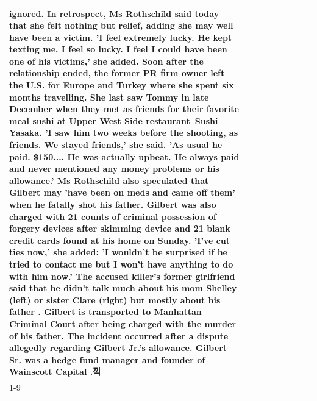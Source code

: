 \begin{table}[H]
\begin{tabular}{lllrlllll}
ignored. In retrospect, Ms Rothschild said today that she felt nothing but relief, adding she may well have been a victim. 'I feel extremely lucky. He kept texting me. I feel so lucky. I feel I could have been one of his victims,' she added. Soon after the relationship ended, the former PR firm owner left the U.S. for Europe and Turkey where she spent six months  travelling. She last saw Tommy in late December when they met as friends for their favorite meal sushi at Upper West Side restaurant Sushi Yasaka. 'I saw him two weeks before the shooting, as friends. We stayed friends,' she said. 'As usual he paid. \$150.... He was actually upbeat. He always paid and never mentioned any money problems or his allowance.' Ms Rothschild also speculated that Gilbert may 'have been on meds and came off them' when he fatally shot his father. Gilbert was also charged with 21 counts of criminal possession of forgery devices after skimming device and 21 blank credit cards found at his home on Sunday. 'I've cut ties now,' she added: 'I wouldn’t be surprised if he tried to contact me but I won’t have anything to do with him now.' The accused killer's former girlfriend said that he didn't talk much about his mom Shelley (left) or sister Clare (right) but mostly about his father . Gilbert is transported to Manhattan Criminal Court  after being charged with the murder of his father. The incident occurred after a dispute allegedly regarding Gilbert Jr.'s allowance. Gilbert Sr. was a hedge fund manager and founder of Wainscott Capital .끽 \\
\cline{1-9}

\end{tabular}
\end{table}
